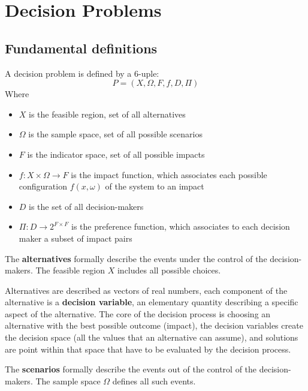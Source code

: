 \section{Decision Problems}

\subsection{Fundamental definitions}

A decision problem is defined by a 6-uple: 
$$ P = (X, \Omega, F, f, D, \Pi)$$
Where
\begin{itemize}
	\item $X$ is the feasible region, set of all alternatives
	
	\item $\Omega$ is the sample space, set of all possible scenarios
	
	\item $F$ is the indicator space, set of all possible impacts 
	
	\item $f: X \times \Omega \rightarrow F$ is the impact function, which associates each possible configuration $f(x, \omega)$ of the system to an impact
	
	\item $D$ is the set of all decision-makers
	
	\item $\Pi: D \rightarrow 2^{F \times F}$ is the preference function, which associates to each decision maker a subset of impact pairs
\end{itemize}

The \textbf{alternatives} formally describe the events under the control of the decision-makers. The feasible region $X$ includes all possible choices. 

Alternatives are described as vectors of real numbers, each component of the alternative is a \textbf{decision variable}, an elementary quantity describing a specific aspect of the alternative. The core of the decision process is choosing an alternative with the best possible outcome (impact), the decision variables create the decision space (all the values that an alternative can assume), and solutions are point within that space that have to be evaluated by the decision process.

The \textbf{scenarios} formally describe the events out of the control of the decision-makers. The sample space $\Omega$ defines all such events.


